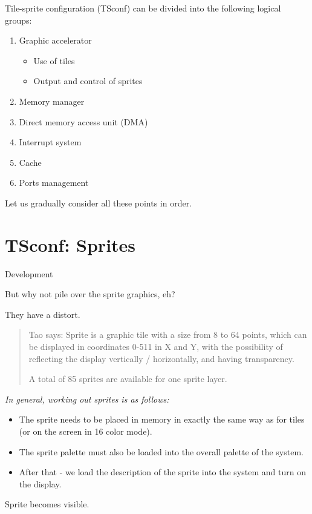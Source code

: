 \documentclass{article}
\begin{document}
Tile-sprite configuration (TSconf) can be divided into the following
logical groups:
\begin{enumerate}
\item Graphic accelerator
  \begin{itemize}
  \item Use of tiles
  \item Output and control of sprites
  \end{itemize}
\item Memory manager
\item Direct memory access unit (DMA)
\item Interrupt system
\item Cache
\item Ports management
\end{enumerate}
Let us gradually consider all these points in order.
\section*{TSconf: Sprites}
Development

But why not pile over the sprite graphics, eh?

They have a distort.
\begin{quotation}
  Tao says: Sprite is a graphic tile with a size from 8 to 64 points,
  which can be displayed in coordinates 0-511 in X and Y, with the
  possibility of reflecting the display vertically / horizontally, and
  having transparency.

  A total of 85 sprites are available for one sprite layer.
\end{quotation}

\emph{In general, working out sprites is as follows:}
\begin{itemize}
\item The sprite needs to be placed in memory in exactly the same way
  as for tiles (or on the screen in 16 color mode).
\item The sprite palette must also be loaded into the overall palette
  of the system.
\item After that - we load the description of the sprite into the
  system and turn on the display.
\end{itemize}
Sprite becomes visible.
\end{document}
